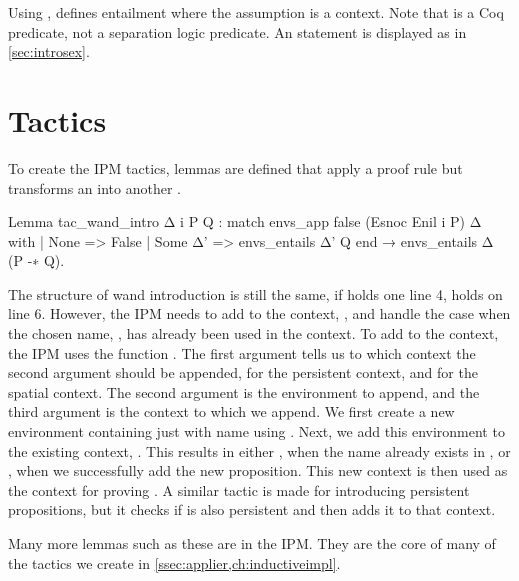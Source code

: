 \documentclass[thesis.tex]{subfiles}
\begin{document}
{Using ,  defines entailment where the assumption is a context. Note that  is a Coq predicate, not a separation logic predicate. An  statement is displayed as in \cref{sec:introsex}.

\section{Tactics}\label{sec:iristactics}
To create the IPM tactics, lemmas are defined that apply a proof rule but transforms an  into another .
\begin{coqcode}
  Lemma tac_wand_intro Δ i P Q :
    match envs_app false (Esnoc Enil i P) Δ with
    | None => False
    | Some Δ' => envs_entails Δ' Q
    end →
    envs_entails Δ (P -∗ Q).
\end{coqcode}
The structure of wand introduction is still the same, if  holds one line 4,  holds on line 6. However, the IPM needs to add  to the context, , and handle the case when the chosen name, , has already been used in the context. To add  to the context, the IPM uses the function . The first argument tells us to which context the second argument should be appended,  for the persistent context, and  for the spatial context. The second argument is the environment to append, and the third argument is the context to which we append. We first create a new environment containing just  with name  using . Next, we add this environment to the existing context, . This results in either , when the name already exists in , or , when we successfully add the new proposition. This new context is then used as the context for proving . A similar tactic is made for introducing persistent propositions, but it checks if  is also persistent and then adds it to that context.

Many more lemmas such as these are in the IPM. They are the core of many of the tactics we create in \cref{ssec:applier,ch:inductiveimpl}.

}
\end{document}

